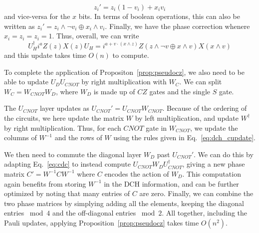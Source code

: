 \[z_{i}' = z_{i}(1-v_{i}) + x_{i}v_{i}\]
and vice-versa for the $x$ bits. In terms of boolean operations, this can also be written as $z_{i}'= z_{i}\wedge\neg v_{i} \oplus x_{i}\wedge v_{i}$. Finally, we have the phase correction whenere $x_{i}=z_{i}=z_{i}=1$. Thus, overall, we can write
\begin{equation}
U_{H}^{\dagger}i^{a}Z(z)X(z)U_{H} = i^{a+v\cdot\left(x\wedge z\right)}Z(z\wedge\neg v \oplus x\wedge v)X(x\wedge v)
\label{eq:dch_hupdate}
\end{equation}
and this update takes time $O(n)$ to compute.\par
To complete the application of Propositon~\ref{prop:pseudocz}, we also need to be able to update $U_{D}U_{CNOT}$ by right multiplication with $W_{C}$. We can split $W_{C}=W_{CNOT}W_{D}$, where $W_{D}$ is made up of $CZ$ gates and the single $S$ gate.\par
The $U_{CNOT}$ layer updates as $U_{CNOT}'=U_{CNOT}W_{CNOT}$. Because of the ordering of the circuits, we here update the matrix $W$ by left multiplication, and update $W^{\dagger}$ by right multiplication. Thus, for each $CNOT$ gate in $W_{CNOT}$, we update the columns of $W^{-1}$ and the rows of $W$ using the rules given in Eq.~\ref{eq:dch_cupdate}.\par
We then need to commute the diagonal layer $W_{D}$ past $U_{CNOT}'$. We can do this by adapting Eq.~\ref{eq:cdc} to instead compute $U_{CNOT}W_{D}U_{CNOT}^{\dagger}$, giving a new phase matrix $C'=W^{-1}CW^{-1}$ where $C$ encodes the action of $W_{D}$. This computation again benefits from storing $W^{-1}$ in the DCH information, and can be further optimized by noting that many entries of $C$ are zero. Finally, we can combine the two phase matrices by simplying adding all the elements, keeping the diagonal entries $\bmod 4$ and the off-diagonal entries $\bmod 2$. All together, including the Pauli updates, applying Proposition~\ref{prop:pseudocz} takes time $O(n^2)$.
